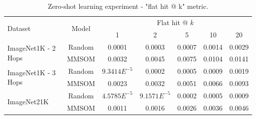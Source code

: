 \documentclass[a4paper]{standalone}
\begin{document}
\begin{table}[h]
    \centering
    \begin{footnotesize}
        \begin{tabularx}{\textwidth}{|X|c|c|c|c|c|c|}
            \hline
            \multirow{2}{*}{Dataset} & \multirow{2}{*}{Model}    & \multicolumn{5}{c|}{Flat hit @ $k$}        \\
            \cline{3-7}              &                           & 1      & 2      & 5      & 10     & 20     \\ 
            \hline
            \hline
            \multirow{2}{*}{ImageNet1K - 2 Hops} & Random        & 0.0001 & 0.0003 & 0.0007 & 0.0014 & 0.0029 \\ 
            \cline{2-7}                          & MMSOM         & 0.0032 & 0.0045 & 0.0075 & 0.0104 & 0.0141 \\ 
            \hline
            \hline
            \multirow{2}{*}{ImageNet1K - 3 Hops} & Random        & $9.3414E^{-5}$ & 0.0002 & 0.0005 & 0.0009 & 0.0019 \\ 
            \cline{2-7}                          & MMSOM         & 0.0023         & 0.0032 & 0.0051 & 0.0066 & 0.0093 \\ 
            \hline
            \hline
            \multirow{2}{*}{ImageNet21K}         & Random        & $4.5785E^{-5}$ & $9.1571E^{-5}$ & 0.0002 & 0.0005 & 0.0009 \\ 
            \cline{2-7}                          & MMSOM         & 0.0011         & 0.0016         & 0.0026 & 0.0036 & 0.0046 \\ 
            \hline
        \end{tabularx}
    \end{footnotesize}
    \caption{Zero-shot learning experiment - "flat hit @ k" metric.}
    \label{tab:ZeroShotFlatResults}
\end{table}
\end{document}
